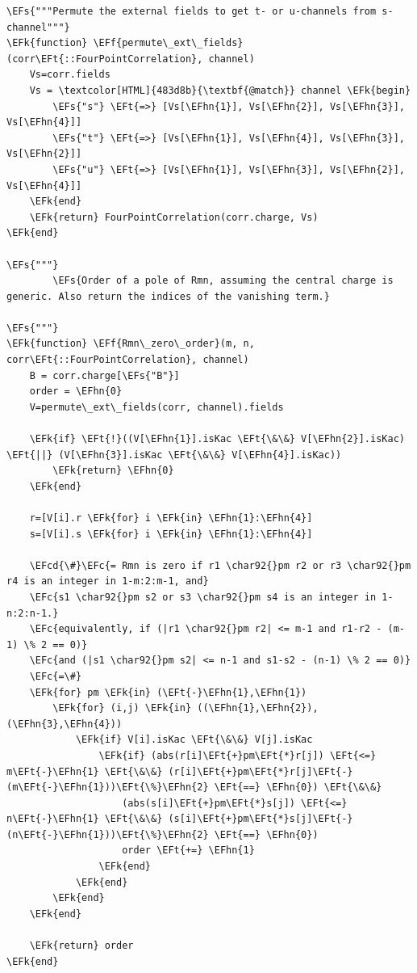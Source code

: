 \documentclass[a4paper]{article}
\numberwithin{equation}{section}
\newcommand{\EFc}[1]{\textcolor{EFc}{#1}} %
\newcommand{\EFcd}[1]{\textcolor{EFcd}{#1}} %
\newcommand{\EFs}[1]{\textcolor{EFs}{#1}} %
\newcommand{\EFk}[1]{\textcolor{EFk}{#1}} %
\newcommand{\EFf}[1]{\textcolor{EFf}{#1}} %
\newcommand{\EFt}[1]{\textcolor{EFt}{#1}} %
\newcommand{\EFhn}[1]{\textcolor{EFhn}{#1}} %
\begin{document}
\begin{itemize}
\begin{Code}
\begin{Verbatim}
\EFs{"""Permute the external fields to get t- or u-channels from s-channel"""}
\EFk{function} \EFf{permute\_ext\_fields}(corr\EFt{::FourPointCorrelation}, channel)
    Vs=corr.fields
    Vs = \textcolor[HTML]{483d8b}{\textbf{@match}} channel \EFk{begin}
        \EFs{"s"} \EFt{=>} [Vs[\EFhn{1}], Vs[\EFhn{2}], Vs[\EFhn{3}], Vs[\EFhn{4}]]
        \EFs{"t"} \EFt{=>} [Vs[\EFhn{1}], Vs[\EFhn{4}], Vs[\EFhn{3}], Vs[\EFhn{2}]]
        \EFs{"u"} \EFt{=>} [Vs[\EFhn{1}], Vs[\EFhn{3}], Vs[\EFhn{2}], Vs[\EFhn{4}]]
    \EFk{end}
    \EFk{return} FourPointCorrelation(corr.charge, Vs)
\EFk{end}

\EFs{"""}
        \EFs{Order of a pole of Rmn, assuming the central charge is generic. Also return the indices of the vanishing term.}

\EFs{"""}
\EFk{function} \EFf{Rmn\_zero\_order}(m, n, corr\EFt{::FourPointCorrelation}, channel)
    B = corr.charge[\EFs{"B"}]
    order = \EFhn{0}
    V=permute\_ext\_fields(corr, channel).fields

    \EFk{if} \EFt{!}((V[\EFhn{1}].isKac \EFt{\&\&} V[\EFhn{2}].isKac) \EFt{||} (V[\EFhn{3}].isKac \EFt{\&\&} V[\EFhn{4}].isKac))
        \EFk{return} \EFhn{0}
    \EFk{end}

    r=[V[i].r \EFk{for} i \EFk{in} \EFhn{1}:\EFhn{4}]
    s=[V[i].s \EFk{for} i \EFk{in} \EFhn{1}:\EFhn{4}]

    \EFcd{\#}\EFc{= Rmn is zero if r1 \char92{}pm r2 or r3 \char92{}pm r4 is an integer in 1-m:2:m-1, and}
    \EFc{s1 \char92{}pm s2 or s3 \char92{}pm s4 is an integer in 1-n:2:n-1.}
    \EFc{equivalently, if (|r1 \char92{}pm r2| <= m-1 and r1-r2 - (m-1) \% 2 == 0)}
    \EFc{and (|s1 \char92{}pm s2| <= n-1 and s1-s2 - (n-1) \% 2 == 0)}
    \EFc{=\#}
    \EFk{for} pm \EFk{in} (\EFt{-}\EFhn{1},\EFhn{1})
        \EFk{for} (i,j) \EFk{in} ((\EFhn{1},\EFhn{2}), (\EFhn{3},\EFhn{4}))
            \EFk{if} V[i].isKac \EFt{\&\&} V[j].isKac
                \EFk{if} (abs(r[i]\EFt{+}pm\EFt{*}r[j]) \EFt{<=} m\EFt{-}\EFhn{1} \EFt{\&\&} (r[i]\EFt{+}pm\EFt{*}r[j]\EFt{-}(m\EFt{-}\EFhn{1}))\EFt{\%}\EFhn{2} \EFt{==} \EFhn{0}) \EFt{\&\&}
                    (abs(s[i]\EFt{+}pm\EFt{*}s[j]) \EFt{<=} n\EFt{-}\EFhn{1} \EFt{\&\&} (s[i]\EFt{+}pm\EFt{*}s[j]\EFt{-}(n\EFt{-}\EFhn{1}))\EFt{\%}\EFhn{2} \EFt{==} \EFhn{0})
                    order \EFt{+=} \EFhn{1}
                \EFk{end}
            \EFk{end}
        \EFk{end}
    \EFk{end}

    \EFk{return} order
\EFk{end}


\end{Verbatim}
\end{Code}
\end{itemize}
\end{document}
